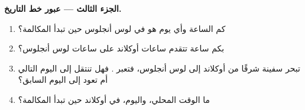 \begin{problem}
\medskip
\noindent\textbf{الجزء الثالث --- عبور خط التاريخ.}
\begin{enumerate}[resume]
  \item كم الساعة وأي يوم هو في لوس أنجلوس حين تبدأ المكالمة؟
  \item بكم ساعة تتقدم ساعات أوكلاند على ساعات لوس أنجلوس؟
  \item تبحر سفينة شرقًا من أوكلاند إلى لوس أنجلوس، فتعبر . فهل تنتقل إلى اليوم التالي أم تعود إلى اليوم السابق؟
  \item ما الوقت المحلي، واليوم، في أوكلاند حين تبدأ
        المكالمة؟
\end{enumerate}
\end{problem}
